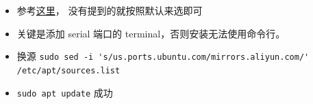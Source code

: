
\begin{itemize}
\item 参考\href{https://www.machunjie.com/linux/1570.html}{这里}， 没有提到的就按照默认来选即可
\item 关键是添加 serial 端口的 terminal，否则安装无法使用命令行。
\item 换源 \verb`sudo sed -i 's/us.ports.ubuntu.com/mirrors.aliyun.com/' /etc/apt/sources.list`
\item \verb`sudo apt update` 成功
\end{itemize}
